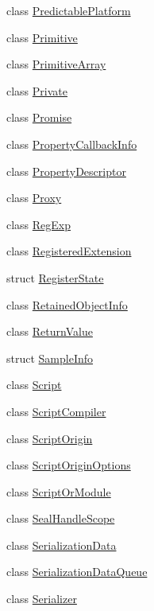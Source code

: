 \begin{DoxyCompactItemize}
\item 
class \mbox{\hyperlink{classv8_1_1PredictablePlatform}{Predictable\+Platform}}
\item 
class \mbox{\hyperlink{classv8_1_1Primitive}{Primitive}}
\item 
class \mbox{\hyperlink{classv8_1_1PrimitiveArray}{Primitive\+Array}}
\item 
class \mbox{\hyperlink{classv8_1_1Private}{Private}}
\item 
class \mbox{\hyperlink{classv8_1_1Promise}{Promise}}
\item 
class \mbox{\hyperlink{classv8_1_1PropertyCallbackInfo}{Property\+Callback\+Info}}
\item 
class \mbox{\hyperlink{classv8_1_1PropertyDescriptor}{Property\+Descriptor}}
\item 
class \mbox{\hyperlink{classv8_1_1Proxy}{Proxy}}
\item 
class \mbox{\hyperlink{classv8_1_1RegExp}{Reg\+Exp}}
\item 
class \mbox{\hyperlink{classv8_1_1RegisteredExtension}{Registered\+Extension}}
\item 
struct \mbox{\hyperlink{structv8_1_1RegisterState}{Register\+State}}
\item 
class \mbox{\hyperlink{classv8_1_1RetainedObjectInfo}{Retained\+Object\+Info}}
\item 
class \mbox{\hyperlink{classv8_1_1ReturnValue}{Return\+Value}}
\item 
struct \mbox{\hyperlink{structv8_1_1SampleInfo}{Sample\+Info}}
\item 
class \mbox{\hyperlink{classv8_1_1Script}{Script}}
\item 
class \mbox{\hyperlink{classv8_1_1ScriptCompiler}{Script\+Compiler}}
\item 
class \mbox{\hyperlink{classv8_1_1ScriptOrigin}{Script\+Origin}}
\item 
class \mbox{\hyperlink{classv8_1_1ScriptOriginOptions}{Script\+Origin\+Options}}
\item 
class \mbox{\hyperlink{classv8_1_1ScriptOrModule}{Script\+Or\+Module}}
\item 
class \mbox{\hyperlink{classv8_1_1SealHandleScope}{Seal\+Handle\+Scope}}
\item 
class \mbox{\hyperlink{classv8_1_1SerializationData}{Serialization\+Data}}
\item 
class \mbox{\hyperlink{classv8_1_1SerializationDataQueue}{Serialization\+Data\+Queue}}
\item 
class \mbox{\hyperlink{classv8_1_1Serializer}{Serializer}}

\end{DoxyCompactItemize}
